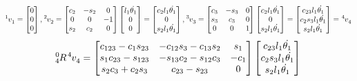 \documentclass[10pt]{article}
\begin{document}
\[
\tensor*[^{1}]{v}{_1} =
\begin{bmatrix}
0 \\
0 \\
0 
\end{bmatrix},
\tensor*[^{2}]{v}{_2} =
\begin{bmatrix}
    c_{2}        & -s_{2}       & 0    \\
    0            & 0            & -1   \\
    s_{2}        & c_{2}        & 0
\end{bmatrix}
\begin{bmatrix}
l_1\dot{\theta_{1}}\\
0 \\
0 
\end{bmatrix} =
\begin{bmatrix}
    c_{2}l_1\dot{\theta_{1}}   \\
    0  \\
    s_{2}l_1\dot{\theta_{1}}
\end{bmatrix}
,
\tensor*[^{3}]{v}{_3} =
\begin{bmatrix}
    c_{3}        & -s_{3}       & 0     \\
    s_{3}        & c_{3}        & 0     \\
    0            & 0            & 1 
\end{bmatrix}
\begin{bmatrix}
    c_{2}l_1\dot{\theta_{1}}   \\
    0  \\
    s_{2}l_1\dot{\theta_{1}}
\end{bmatrix} = 
\begin{bmatrix}
    c_{23}l_1\dot{\theta_{1}}   \\
    c_{2}s_{3}l_1\dot{\theta_{1}} \\
    s_{2}l_1\dot{\theta_{1}}
\end{bmatrix}
= \tensor*[^{4}]{v}{_4}
\]
\[
\tensor*[^{0}_{4}]{R}{}
\tensor*[^{4}]{v}{_4} =
\begin{bmatrix}
c_{123}-c_{1}s_{23}   & -c_{12}s_{3}-c_{13}s_{2} & s_{1} \\
s_{1}c_{23}-s_{123}    & -s_{13}c_{2}-s_{12}c_{3} & -c_{1}\\
s_{2}c_{3}+c_{2}s_{3}  & c_{23}-s_{23}            & 0      
\end{bmatrix}
\begin{bmatrix}
    c_{23}l_1\dot{\theta_{1}}   \\
    c_{2}s_{3}l_1\dot{\theta_{1}} \\
    s_{2}l_1\dot{\theta_{1}}
\end{bmatrix} 
\]
\end{document}
